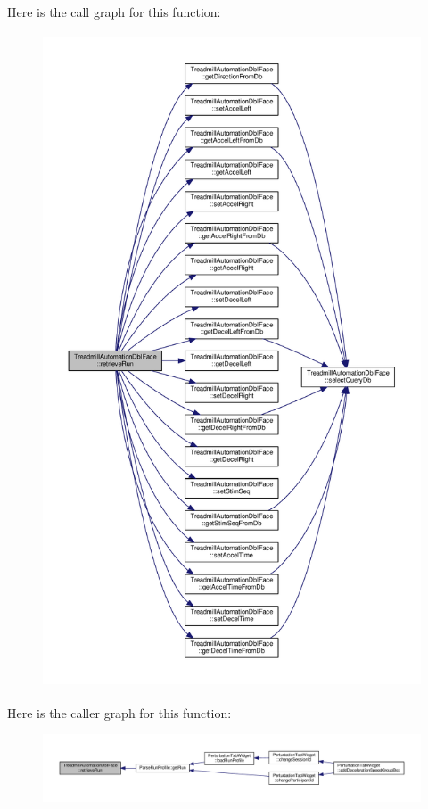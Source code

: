 Here is the call graph for this function\+:
\nopagebreak
\begin{figure}[H]
\begin{center}
\leavevmode
\includegraphics[height=550pt]{class_treadmill_automation_db_i_face_ab18ea9e92e892e01393d6d9a597b4b13_cgraph}
\end{center}
\end{figure}
Here is the caller graph for this function\+:
\nopagebreak
\begin{figure}[H]
\begin{center}
\leavevmode
\includegraphics[width=350pt]{class_treadmill_automation_db_i_face_ab18ea9e92e892e01393d6d9a597b4b13_icgraph}
\end{center}
\end{figure}
\mbox{\label{class_treadmill_automation_db_i_face_a0776350cdf604faa9570329a686d4b34}} 
